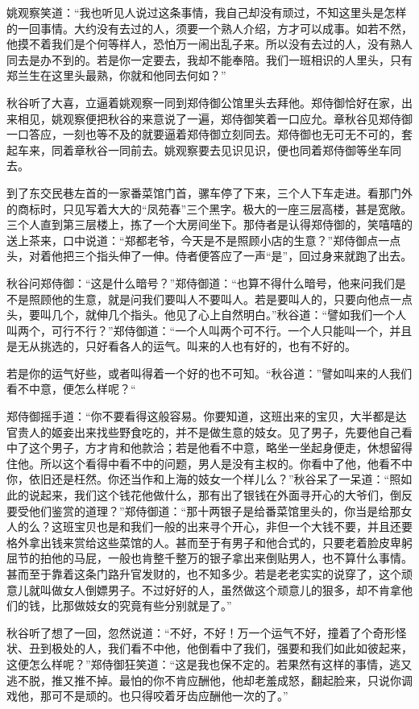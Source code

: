 \documentclass[12pt,UTF8]{ctexbook}
\begin{document}
{{{姚观察笑道：“我也听见人说过这条事情，我自己却没有顽过，不知这里头是怎样的一回事情。大约没有去过的人，须要一个熟人介绍，方才可以成事。如若不然，他摸不着我们是个何等样人，恐怕万一闹出乱子来。所以没有去过的人，没有熟人同去是办不到的。若是你一定要去，我却不能奉陪。我们一班相识的人里头，只有郑兰生在这里头最熟，你就和他同去何如？”

秋谷听了大喜，立逼着姚观察一同到郑侍御公馆里头去拜他。郑侍御恰好在家，出来相见，姚观察便把秋谷的来意说了一遍，郑侍御笑着一口应允。章秋谷见郑侍御一口答应，一刻也等不及的就要逼着郑侍御立刻同去。郑侍御也无可无不可的，套起车来，同着章秋谷一同前去。姚观察要去见识见识，便也同着郑侍御等坐车同去。

到了东交民巷左首的一家番菜馆门首，骡车停了下来，三个人下车走进。看那门外的商标时，只见写着大大的“凤苑春”三个黑字。极大的一座三层高楼，甚是宽敞。三个人直到第三层楼上，拣了一个大房间坐下。那侍者是认得郑侍御的，笑嘻嘻的送上茶来，口中说道：“郑都老爷，今天是不是照顾小店的生意？”郑侍御点一点头，对着他把三个指头伸了一伸。侍者便答应了一声“是”，回过身来就跑了出去。

秋谷问郑侍御：“这是什么暗号？”郑侍御道：“也算不得什么暗号，他来问我们是不是照顾他的生意，就是问我们要叫人不要叫人。若是要叫人的，只要向他点一点头，要叫几个，就伸几个指头。他见了心上自然明白。”秋谷道：“譬如我们一个人叫两个，可行不行？”郑侍御道：“一个人叫两个可不行。一个人只能叫一个，并且是无从挑选的，只好看各人的运气。叫来的人也有好的，也有不好的。

若是你的运气好些，或者叫得着一个好的也不可知。“秋谷道：”譬如叫来的人我们看不中意，便怎么样呢？“

郑侍御摇手道：“你不要看得这般容易。你要知道，这班出来的宝贝，大半都是达官贵人的姬妾出来找些野食吃的，并不是做生意的妓女。见了男子，先要他自己看中了这个男子，方才肯和他款洽；若是他看不中意，略坐一坐起身便走，休想留得住他。所以这个看得中看不中的问题，男人是没有主权的。你看中了他，他看不中你，依旧还是枉然。你还当作和上海的妓女一个样儿么？”秋谷呆了一呆道：“照如此的说起来，我们这个钱花他做什么，那有出了银钱在外面寻开心的大爷们，倒反要受他们鉴赏的道理？”郑侍御道：“那十两银子是给番菜馆里头的，你当是给那女人的么？这班宝贝也是和我们一般的出来寻个开心，非但一个大钱不要，并且还要格外拿出钱来赏给这些菜馆的人。甚而至于有男子和他合式的，只要老着脸皮卑躬屈节的拍他的马屁，一般也肯整千整万的银子拿出来倒贴男人，也不算什么事情。甚而至于靠着这条门路升官发财的，也不知多少。若是老老实实的说穿了，这个顽意儿就叫做女人倒嫖男子。不过好好的人，虽然做这个顽意儿的狠多，却不肯拿他们的钱，比那做妓女的究竟有些分别就是了。”

秋谷听了想了一回，忽然说道：“不好，不好！万一个运气不好，撞着了个奇形怪状、丑到极处的人，我们看不中他，他倒看中了我们，强要和我们如此如彼起来，这便怎么样呢？”郑侍御狂笑道：“这是我也保不定的。若果然有这样的事情，逃又逃不脱，推又推不掉。最怕的你不肯应酬他，他却老羞成怒，翻起脸来，只说你调戏他，那可不是顽的。也只得咬着牙齿应酬他一次的了。”

}}}
\end{document}
